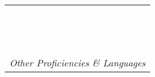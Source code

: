 \documentclass{article}
\begin{document}
\begin{minipage}{.3\textwidth}
   \begin{tabular}{|m{\textwidth}|}
     \hline
     \\\\\\\\\\\\\\\\\\\\\\\\\\
     \vspace{.5em}\\
     \textit{\footnotesize{Other Proficiencies \& Languages}}\\
     \hline
   \end{tabular}
 \end{minipage}
\end{document}
